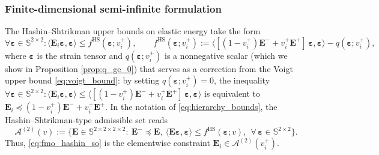 \documentclass[preprint,3p]{elsarticle}
\newcommand{\tenss}[1]{\bm{\mathbf{#1}}}            %
\newcommand{\tensf}[1]{\bm{\mathbf{#1}}}            %
\newcommand{\strain}{\tenss{\varepsilon}}           %
\newcommand{\Ei}{\tensf{E}_i}                       %
\newcommand{\Emin}{\tensf{E}^{-}}                   %
\newcommand{\Emax}{\tensf{E}^{+}}                   %
\begin{document}
\subsubsection{Finite-dimensional semi-infinite formulation}

The Hashin--Shtrikman upper bounds on elastic energy take the form
%
\begin{equation}\label{eq:hashin_shtrikman}
    \forall \strain \in \mathbb{S}^{2\times2}: \langle \Ei \strain, \strain \rangle \le f^\mathrm{HS}(\strain;v_i^+),\qquad f^\mathrm{HS}(\strain;v_i^+):=\langle [(1-v_i^{+})\Emin+v_i^{+}\Emax]\,\strain,\strain\rangle
- q(\strain;v_i^+),
\end{equation}
%
where $\strain$ is the strain tensor and $q(\strain;v_i^+)$ is a nonnegative scalar (which we show in Proposition \ref{prop:q_ge_0}) that serves as a correction from the Voigt upper bound \eqref{eq:voigt_bound}: by setting $q(\strain;v_i^+) = 0$, the inequality $\forall \strain \in \mathbb{S}^{2\times2}: \langle \Ei \strain, \strain \rangle \le \langle [(1-v_i^{+})\Emin+v_i^{+}\Emax]\,\strain,\strain\rangle$ is equivalent to $\Ei \preceq (1-v_i^{+})\Emin+v_i^{+}\Emax$. In the notation of \eqref{eq:hierarchy_bounds}, the Hashin--Shtrikman-type admissible set reads
%
\begin{equation}\label{eq:A2_def}
\mathcal A^{(2)}(v)
:=\Big\{\tensf E\in\mathbb{S}^{2\times2\times2\times2}:\ \Emin\preceq \tensf E,\ 
\langle \tensf E \strain,\strain\rangle \le f^{\mathrm{HS}}(\strain;v),\ \ \forall\,\strain\in\mathbb{S}^{2\times2}\Big\}.
\end{equation}
%
Thus, \eqref{eq:fmo_hashin_so} is the elementwise constraint $\Ei\in \mathcal A^{(2)}(v_i^+)$.
\end{document}
